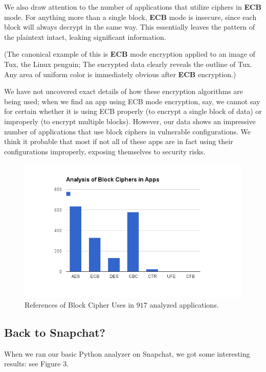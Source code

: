 \documentclass[11pt]{article}
\numberwithin{theorem}{subsection}
\begin{document}
We also draw attention to the number of applications that utilize ciphers in \textbf{ECB} mode. For anything more than a single block, 
\textbf{ECB} mode is insecure, since each block will always decrypt in the same way. This essentially leaves the pattern of the 
plaintext intact, leaking significant information. 

(The canonical example of this is \textbf{ECB} mode encryption applied to an image of Tux, the Linux penguin; The encrypted data
clearly reveals the outline of Tux. Any area of uniform color is immediately obvious after \textbf{ECB} encryption.)

We have not uncovered exact details of how these encryption algorithms are being used; when we find an app using ECB mode encryption,
say, we cannot say for certain whether it is using ECB properly (to encrypt a single block of data) or improperly (to encrypt multiple
blocks).  However, our data shows an impressive number of applications that use block ciphers in vulnerable configurations.  We think it
probable that most if not all of these apps are in fact using their configurations improperly, exposing themselves to security risks.

\begin{figure}[H]
  \caption{References of Block Cipher Uses in $917$ analyzed applications.}
  \centering
  \includegraphics[scale=0.8]{fig2.png}
\end{figure}

\subsection{Back to Snapchat?}

When we ran our basic Python analyzer on Snapchat, we got some interesting results: see Figure 3.
\end{document}
